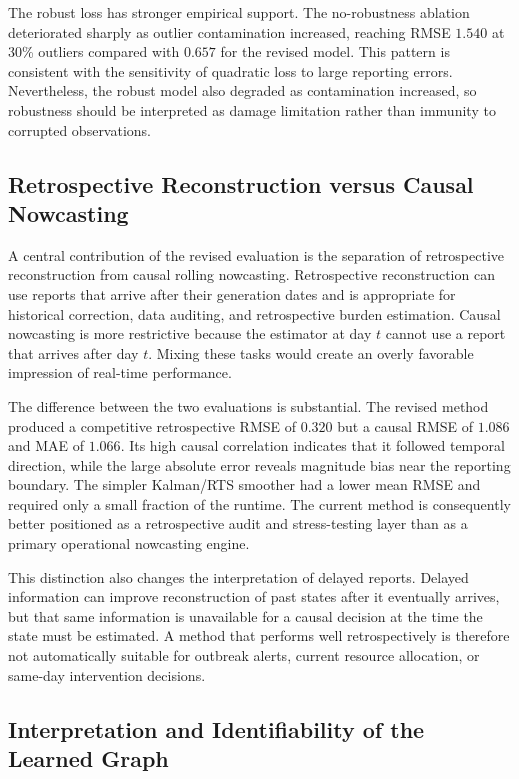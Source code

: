 The robust loss has stronger empirical support. The no-robustness ablation deteriorated sharply as outlier contamination increased, reaching RMSE $1.540$ at 30\% outliers compared with $0.657$ for the revised model. This pattern is consistent with the sensitivity of quadratic loss to large reporting errors. Nevertheless, the robust model also degraded as contamination increased, so robustness should be interpreted as damage limitation rather than immunity to corrupted observations.

\subsection{Retrospective Reconstruction versus Causal Nowcasting}
\label{subsec:reconstruction_vs_nowcasting}

A central contribution of the revised evaluation is the separation of retrospective reconstruction from causal rolling nowcasting. Retrospective reconstruction can use reports that arrive after their generation dates and is appropriate for historical correction, data auditing, and retrospective burden estimation. Causal nowcasting is more restrictive because the estimator at day $t$ cannot use a report that arrives after day $t$. Mixing these tasks would create an overly favorable impression of real-time performance.

The difference between the two evaluations is substantial. The revised method produced a competitive retrospective RMSE of $0.320$ but a causal RMSE of $1.086$ and MAE of $1.066$. Its high causal correlation indicates that it followed temporal direction, while the large absolute error reveals magnitude bias near the reporting boundary. The simpler Kalman/RTS smoother had a lower mean RMSE and required only a small fraction of the runtime. The current method is consequently better positioned as a retrospective audit and stress-testing layer than as a primary operational nowcasting engine.

This distinction also changes the interpretation of delayed reports. Delayed information can improve reconstruction of past states after it eventually arrives, but that same information is unavailable for a causal decision at the time the state must be estimated. A method that performs well retrospectively is therefore not automatically suitable for outbreak alerts, current resource allocation, or same-day intervention decisions.

\subsection{Interpretation and Identifiability of the Learned Graph}
\label{subsec:graph_discussion}

